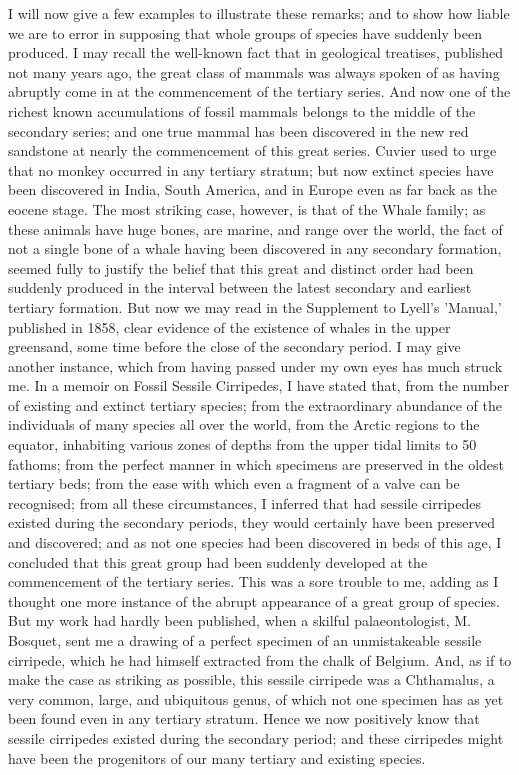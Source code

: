 I will now give a few examples to illustrate these remarks; and to show how liable we are to error in supposing that whole groups of species have suddenly been produced. I may recall the well-known fact that in geological treatises, published not many years ago, the great class of mammals was always spoken of as having abruptly come in at the commencement of the tertiary series. And now one of the richest known accumulations of fossil mammals belongs to the middle of the secondary series; and one true mammal has been discovered in the new red sandstone at nearly the commencement of this great series. Cuvier used to urge that no monkey occurred in any tertiary stratum; but now extinct species have been discovered in India, South America, and in Europe even as far back as the eocene stage. The most striking case, however, is that of the Whale family; as these animals have huge bones, are marine, and range over the world, the fact of not a single bone of a whale having been discovered in any secondary formation, seemed fully to justify the belief that this great and distinct order had been suddenly produced in the interval between the latest secondary and earliest tertiary formation. But now we may read in the Supplement to Lyell's 'Manual,' published in 1858, clear evidence of the existence of whales in the upper greensand, some time before the close of the secondary period.
I may give another instance, which from having passed under my own eyes has much struck me. In a memoir on Fossil Sessile Cirripedes, I have stated that, from the number of existing and extinct tertiary species; from the extraordinary abundance of the individuals of many species all over the world, from the Arctic regions to the equator, inhabiting various zones of depths from the upper tidal limits to 50 fathoms; from the perfect manner in which specimens are preserved in the oldest tertiary beds; from the ease with which even a fragment of a valve can be recognised; from all these circumstances, I inferred that had sessile cirripedes existed during the secondary periods, they would certainly have been preserved and discovered; and as not one species had been discovered in beds of this age, I concluded that this great group had been suddenly developed at the commencement of the tertiary series. This was a sore trouble to me, adding as I thought one more instance of the abrupt appearance of a great group of species. But my work had hardly been published, when a skilful palaeontologist, M. Bosquet, sent me a drawing of a perfect specimen of an unmistakeable sessile cirripede, which he had himself extracted from the chalk of Belgium. And, as if to make the case as striking as possible, this sessile cirripede was a Chthamalus, a very common, large, and ubiquitous genus, of which not one specimen has as yet been found even in any tertiary stratum. Hence we now positively know that sessile cirripedes existed during the secondary period; and these cirripedes might have been the progenitors of our many tertiary and existing species.
